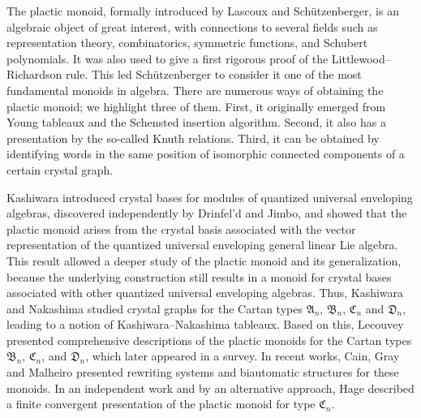 \documentclass[a4paper,reqno]{amsart}
\numberwithin{equation}{section}
\theoremstyle{plain}
\theoremstyle{definition}
\theoremstyle{remark}
\newcommand*{\avoidrefbreak}{\nolinebreak[3] }   %
\newcommand*{\avoidcitebreak}{\nolinebreak[3] }  %
\newcommand*{\tA}{\mathfrak{A}}
\newcommand*{\tB}{\mathfrak{B}}
\newcommand*{\tC}{\mathfrak{C}}
\newcommand*{\tD}{\mathfrak{D}}
\newcommand*{\tAn}{\tA_{n}}
\newcommand*{\tBn}{\tB_n}
\newcommand*{\tCn}{\tC_n}
\newcommand*{\tDn}{\tD_n}
\begin{document}
The plactic monoid, formally introduced  by Lascoux and Sch\"{u}tzenberger\avoidcitebreak \cite{LS81}, is an algebraic object of great interest, with connections to several fields such as representation theory, combinatorics\avoidcitebreak \cite{Ful97}, symmetric functions, and Schubert polynomials\avoidcitebreak \cite{LS85,LS89}.
It was also used to give a first rigorous proof of the Littlewood--Richardson rule\avoidcitebreak \cite{LR34}.
This led Sch\"{u}tzenberger\avoidcitebreak \cite{Sch97} to consider it one of the most fundamental monoids in algebra.
There are numerous ways of obtaining the plactic monoid; we highlight three of them.
First, it originally emerged from Young tableaux and the Schensted insertion algorithm\avoidcitebreak \cite{Sch61}.
Second, it also has a presentation by the so-called Knuth relations\avoidcitebreak \cite{Knu70}.
Third, it can be obtained by identifying words in the same position of isomorphic connected components of a certain crystal graph.

Kashiwara\avoidcitebreak \cite{Kas90,Kas91,Kas94} introduced crystal bases for modules of quantized universal enveloping algebras, discovered independently by Drinfel'd\avoidcitebreak \cite{Dri85} and Jimbo\avoidcitebreak \cite{Jim85}, and showed that the plactic monoid arises from the crystal basis associated with the vector representation of the quantized universal enveloping general linear Lie algebra.
This result allowed a deeper study of the plactic monoid and its generalization, because the underlying construction still results in a monoid for crystal bases associated with other quantized universal enveloping algebras.
Thus, Kashiwara and Nakashima\avoidcitebreak \cite{KN94} studied crystal graphs for the Cartan types $\tAn$, $\tBn$, $\tCn$ and $\tDn$, leading to a notion of Kashiwara--Nakashima tableaux.
Based on this, Lecouvey\avoidcitebreak \cite{Lec02,Lec03} presented comprehensive descriptions of the plactic monoids for the Cartan types $\tBn$, $\tCn$, and $\tDn$, which later appeared in a survey\avoidcitebreak \cite{Lec07}.
In recent works, Cain, Gray and Malheiro\avoidcitebreak \cite{CGM15f,CGM19} presented rewriting systems and biautomatic structures for these monoids.
In an independent work and by an alternative approach, Hage\avoidrefbreak \cite{Hag15} described a finite convergent presentation of the plactic monoid for type $\tCn$.
\end{document}
